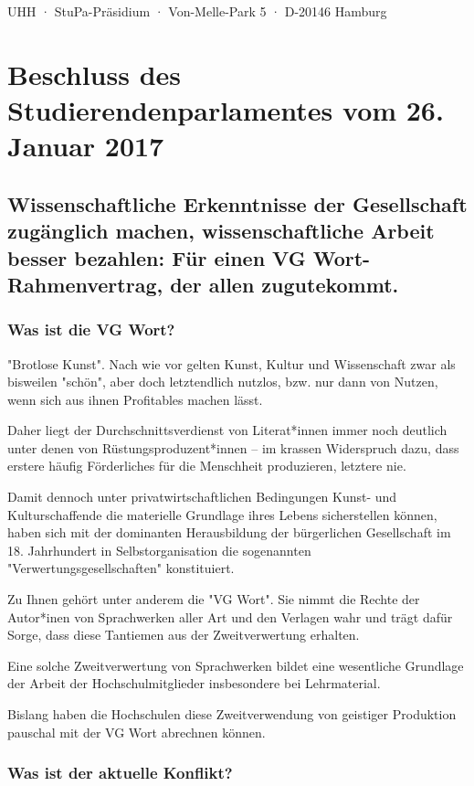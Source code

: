 \documentclass[ngerman,headheight=70pt]{scrartcl}
\begin{document}
    UHH · StuPa-Präsidium · Von-Melle-Park 5 · D-20146 Hamburg

    \section*{Beschluss des Studierendenparlamentes vom 26. Januar 2017}
    \subsection*{Wissenschaftliche Erkenntnisse der Gesellschaft zugänglich machen,
    wissenschaftliche Arbeit besser bezahlen: Für einen VG Wort-Rahmenvertrag, der
    allen zugutekommt.}

    \subsubsection*{Was ist die VG Wort?}

    "Brotlose Kunst". Nach wie vor gelten Kunst, Kultur und Wissenschaft zwar
    als bisweilen "schön", aber doch letztendlich nutzlos, bzw. nur dann von
    Nutzen, wenn sich aus ihnen Profitables machen lässt.

    Daher liegt der Durchschnittsverdienst von Literat*innen immer noch deutlich
    unter denen von Rüstungsproduzent*innen -- im krassen Widerspruch dazu, dass
    erstere häufig Förderliches für die Menschheit produzieren, letztere nie.

    Damit dennoch unter privatwirtschaftlichen Bedingungen Kunst- und
    Kulturschaffende die materielle Grundlage ihres Lebens sicherstellen können,
    haben sich mit der dominanten Herausbildung der bürgerlichen Gesellschaft im
    18. Jahrhundert in Selbstorganisation die sogenannten "Verwertungsgesellschaften"
    konstituiert.

    Zu Ihnen gehört unter anderem die "VG Wort". Sie nimmt die Rechte der
    Autor*inen von Sprachwerken aller Art und den Verlagen wahr und trägt dafür
    Sorge, dass diese Tantiemen aus der Zweitverwertung erhalten.

    Eine solche Zweitverwertung von Sprachwerken bildet eine wesentliche Grundlage
    der Arbeit der Hochschulmitglieder insbesondere bei Lehrmaterial.

    Bislang haben die Hochschulen diese Zweitverwendung von geistiger Produktion
    pauschal mit der VG Wort abrechnen können.

    \subsubsection*{Was ist der aktuelle Konflikt?}
\end{document}
